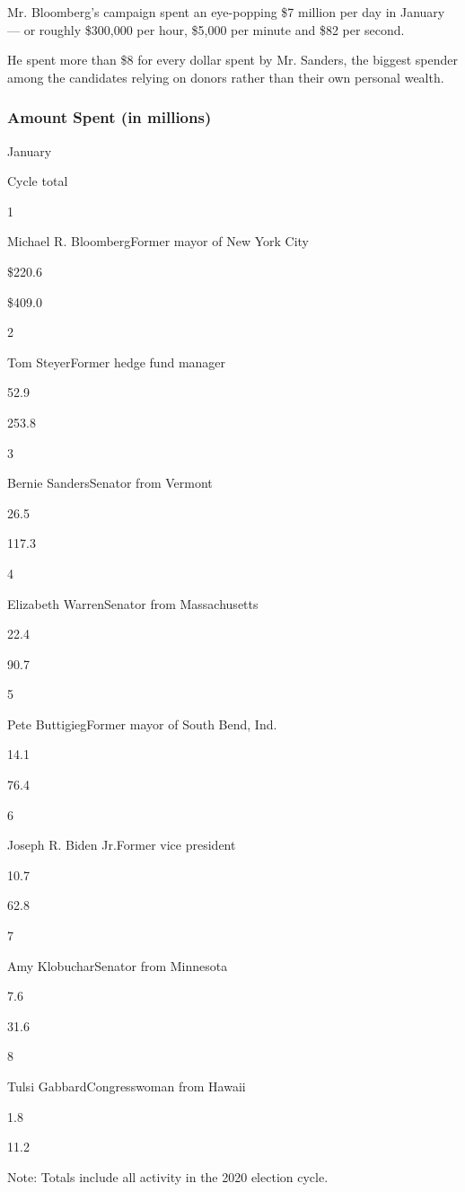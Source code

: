 Mr. Bloomberg's campaign spent an eye-popping \$7 million per day in
January --- or roughly \$300,000 per hour, \$5,000 per minute and \$82
per second.

He spent more than \$8 for every dollar spent by Mr. Sanders, the
biggest spender among the candidates relying on donors rather than their
own personal wealth.

\hypertarget{amount-spent-in-millions}{%
\subsubsection{Amount Spent (in
millions)}\label{amount-spent-in-millions}}

January

Cycle total

1

Michael R. BloombergFormer mayor of New York City

\$220.6

\$409.0

2

Tom SteyerFormer hedge fund manager

52.9

253.8

3

Bernie SandersSenator from Vermont

26.5

117.3

4

Elizabeth WarrenSenator from Massachusetts

22.4

90.7

5

Pete ButtigiegFormer mayor of South Bend, Ind.

14.1

76.4

6

Joseph R. Biden Jr.Former vice president

10.7

62.8

7

Amy KlobucharSenator from Minnesota

7.6

31.6

8

Tulsi GabbardCongresswoman from Hawaii

1.8

11.2

Note: Totals include all activity in the 2020 election cycle.

